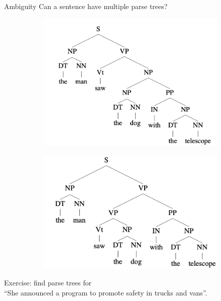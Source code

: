 \documentclass[usenames,dvipsnames,notes]{beamer}
\begin{document}
\begin{frame}
    {Ambiguity}
    Can a sentence have multiple parse trees?
    \begin{figure}
        \begin{subfigure}[b]{0.45\textwidth}
            \includegraphics[width=\textwidth]{figures/parse-1.png}
        \end{subfigure}
        \begin{subfigure}[b]{0.45\textwidth}
            \includegraphics[width=\textwidth]{figures/parse-2.png}
        \end{subfigure}
    \end{figure}

    Exercise: find parse trees for\\
    ``She announced a program to promote safety in trucks and vans''.
\end{frame}
\end{document}
